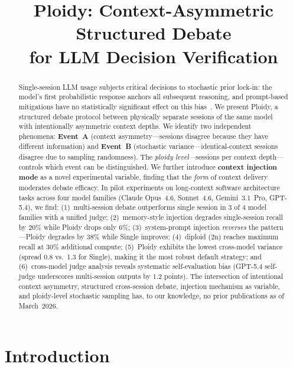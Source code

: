 \documentclass{article}
\title{Ploidy: Context-Asymmetric Structured Debate\\for LLM Decision Verification}
\begin{document}
\maketitle

\begin{abstract}
Single-session LLM usage subjects critical decisions to stochastic prior lock-in: the model's first probabilistic response anchors all subsequent reasoning, and prompt-based mitigations have no statistically significant effect on this bias~\citep{feng2026anchoring}. We present Ploidy, a structured debate protocol between physically separate sessions of the same model with intentionally asymmetric context depths. We identify two independent phenomena: \textbf{Event~A} (context asymmetry---sessions disagree because they have different information) and \textbf{Event~B} (stochastic variance---identical-context sessions disagree due to sampling randomness). The \emph{ploidy level}---sessions per context depth---controls which event can be distinguished. We further introduce \textbf{context injection mode} as a novel experimental variable, finding that the \emph{form} of context delivery moderates debate efficacy. In pilot experiments on long-context software architecture tasks across four model families (Claude Opus~4.6, Sonnet~4.6, Gemini~3.1~Pro, GPT-5.4), we find: (1)~multi-session debate outperforms single session in 3 of 4 model families with a unified judge; (2)~memory-style injection degrades single-session recall by 20\% while Ploidy drops only 6\%; (3)~system-prompt injection \emph{reverses} the pattern---Ploidy degrades by 38\% while Single improves; (4)~diploid (2n) reaches maximum recall at 30\% additional compute; (5)~Ploidy exhibits the lowest cross-model variance (spread 0.8 vs.\ 1.3 for Single), making it the most robust default strategy; and (6)~cross-model judge analysis reveals systematic self-evaluation bias (GPT-5.4 self-judge underscores multi-session outputs by 1.2 points). The intersection of intentional context asymmetry, structured cross-session debate, injection mechanism as variable, and ploidy-level stochastic sampling has, to our knowledge, no prior publications as of March~2026.
\end{abstract}

\section{Introduction}
\label{sec:introduction}
\end{document}
